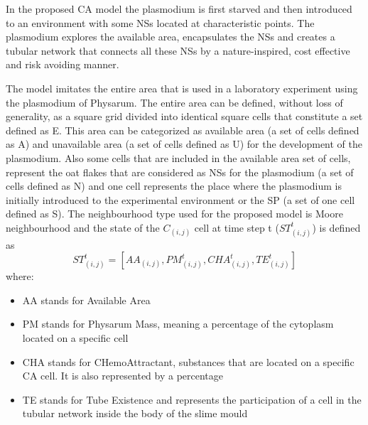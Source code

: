 In the proposed CA model \cite{Tsompanas2016} the plasmodium is first starved and then introduced to an environment with some NSs located at characteristic points. The plasmodium explores the available area, encapsulates the NSs and creates a tubular network that connects all these NSs by a nature-inspired, cost effective and risk avoiding manner.
\par
The model imitates the entire area that is used in a laboratory experiment using the plasmodium of Physarum. The entire area can be defined, without loss of generality, as a square grid divided into identical square cells that constitute a set defined as E. This area can be categorized as available area (a set of cells defined as A) and unavailable area (a set of cells defined as U) for the development of the plasmodium.
Also some cells that are included in the available area set of cells, represent the oat flakes that are considered as NSs for the plasmodium (a set of cells defined as N) and one cell represents the place where the plasmodium is initially introduced to the
experimental environment or the SP (a set of one cell defined as S). 
The neighbourhood type used for the proposed model is Moore neighbourhood and the state of the $C_{(i, j)}$ cell at time step t ($ ST^t_{(i, j)}$) is defined as \[ST^t_{(i, j)} = [AA_{(i, j)}, PM^t_{(i, j)}, CHA^t_{(i, j)}, TE^t_{(i, j)}]\] where:
\begin{itemize}
\item AA stands for Available Area
\item PM stands for Physarum Mass, meaning a percentage of the cytoplasm located on a specific cell
\item CHA stands for CHemoAttractant, substances that are located on a specific CA cell. It is also represented by a percentage
\item TE stands for Tube Existence and represents the participation of a cell in the tubular network inside the body of the slime mould
\end{itemize}